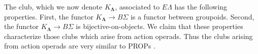 \documentclass{amsbook} %
\newcommand{\mb}{\mathbf}
\numberwithin{section}{chapter}
\begin{document}
The club, which we now denote $K_{\mb{\Lambda}}$, associated to $E\Lambda$ has the following properties.  First, the functor $K_{\mb{\Lambda}} \rightarrow B\Sigma$ is a functor between groupoids.  Second, the functor $K_{\mb{\Lambda}} \rightarrow B\Sigma$ is  bijective-on-objects.  We claim that these properties characterize those clubs which arise from action operads.  Thus the clubs arising from action operads are very similar to PROPs \cite{mac_prop, markl_prop}.
\end{document}
